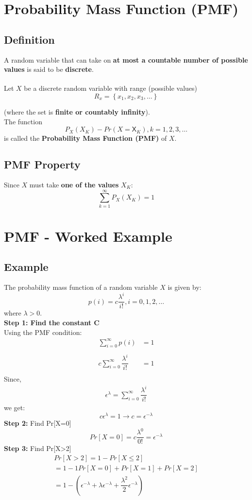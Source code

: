 \documentclass[11pt]{article}
\begin{document}
\section{Probability Mass Function (PMF)}
\subsection{Definition}
A random variable that can take on \textbf{at most a countable number of possible values} is said to be \textbf{discrete}.\\\\
Let $X$ be a discrete random variable with range (possible values)
$$R_x = \left\{ x_1, x_2, x_3, \dots \right\}$$

(where the set is \textbf{finite or countably infinity}).\\
The function
$$P_X(X_K) - Pr(X=\mathsf{X}_K), k = 1, 2, 3, \dots$$
is called the \textbf{Probability Mass Function (PMF)} of $X$.
\subsection{PMF Property}
Since $X$ must take \textbf{one of the values} $X_K$:
$$\sum_{k=1}^{\infty}P_X(X_K)=1$$

\section{PMF - Worked Example}
\subsection*{Example}
The probability mass function of a random variable $X$ is given by:
$$p(i) = c\dfrac{\lambda^i}{i!}, i = 0, 1, 2, \dots$$
where $\lambda > 0$.\\
\textbf{Step 1: Find the constant C}\\
Using the PMF condition:
\begin{align*}
	\sum_{i=0}^{\infty}p(i) &= 1\\\\
	c\sum_{i=0}^{\infty}\dfrac{\lambda^i}{i!} &= 1\\
\end{align*}
Since,
\begin{align*}
	\epsilon^\lambda = \sum_{i=0}^{\infty}\dfrac{\lambda^i}{i!}
\end{align*}
we get:
$$c\epsilon^\lambda = 1 \to c = \epsilon^{-\lambda}$$
\textbf{Step 2:} Find Pr[X=0]
	$$Pr[X=0] = c\dfrac{\lambda^0}{0!} = \epsilon^{-\lambda}$$
\textbf{Step 3:} Find Pr[X>2]\\
\begin{align*}
Pr[X>2] = 1 - Pr[X\leq2]\\
= 1-1 {Pr[X=0] + Pr[X=1] + Pr[X=2]}\\
= 1 - \left( \epsilon^{-\lambda} + \lambda\epsilon^{-\lambda} + \dfrac{\lambda^2}{2}\epsilon^{-\lambda} \right)
\end{align*}
\end{document}
